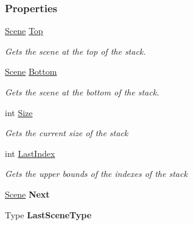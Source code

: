 \subsubsection*{Properties}
\begin{DoxyCompactItemize}
\item 
\hyperlink{class_m_b2_d_1_1_scenes_1_1_scene}{Scene} \hyperlink{class_m_b2_d_1_1_scenes_1_1_scene_stack_ad409d4fad58a067955ee1f6ed88229ef}{Top}
\begin{DoxyCompactList}\small\item\em Gets the scene at the top of the stack. \end{DoxyCompactList}\item 
\hyperlink{class_m_b2_d_1_1_scenes_1_1_scene}{Scene} \hyperlink{class_m_b2_d_1_1_scenes_1_1_scene_stack_a916ab93964a454fa69697bef787c79d6}{Bottom}
\begin{DoxyCompactList}\small\item\em Gets the scene at the bottom of the stack. \end{DoxyCompactList}\item 
int \hyperlink{class_m_b2_d_1_1_scenes_1_1_scene_stack_a960aea6084b685c9cb4fce6b1a586009}{Size}
\begin{DoxyCompactList}\small\item\em Gets the current size of the stack \end{DoxyCompactList}\item 
int \hyperlink{class_m_b2_d_1_1_scenes_1_1_scene_stack_a4c0fa3522458fb0d64cee1a54f31d50d}{Last\+Index}
\begin{DoxyCompactList}\small\item\em Gets the upper bounds of the indexes of the stack \end{DoxyCompactList}\item 
\hypertarget{class_m_b2_d_1_1_scenes_1_1_scene_stack_a287e35dc511d160ddad89f49710c38b0}{}\label{class_m_b2_d_1_1_scenes_1_1_scene_stack_a287e35dc511d160ddad89f49710c38b0} 
\hyperlink{class_m_b2_d_1_1_scenes_1_1_scene}{Scene} {\bfseries Next}
\item 
\hypertarget{class_m_b2_d_1_1_scenes_1_1_scene_stack_a1937f6c80443c9486b0afe5a8826ff2b}{}\label{class_m_b2_d_1_1_scenes_1_1_scene_stack_a1937f6c80443c9486b0afe5a8826ff2b} 
Type {\bfseries Last\+Scene\+Type}
\end{DoxyCompactItemize}


